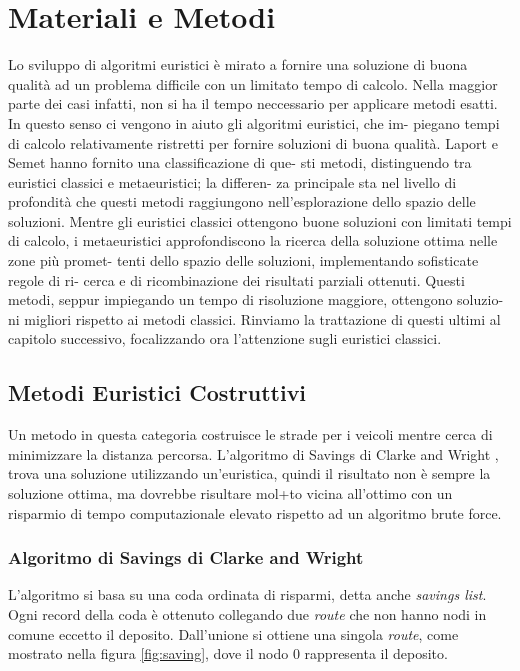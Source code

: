 \documentclass[]{article}
\begin{document}
\section{Materiali e Metodi}
Lo sviluppo di algoritmi euristici è mirato a fornire una soluzione di buona
qualità ad un problema difficile con un limitato tempo di calcolo. Nella
maggior parte dei casi infatti, non si ha il tempo neccessario per applicare
metodi esatti.
In questo senso ci vengono in aiuto gli algoritmi euristici, che im-
piegano tempi di calcolo relativamente ristretti per fornire soluzioni di
buona qualità. Laport e Semet hanno fornito una classificazione di que-
sti metodi, distinguendo tra euristici classici e metaeuristici; la differen-
za principale sta nel livello di profondità che questi metodi raggiungono
nell’esplorazione dello spazio delle soluzioni. Mentre gli euristici classici
ottengono buone soluzioni con limitati tempi di calcolo, i metaeuristici
approfondiscono la ricerca della soluzione ottima nelle zone più promet-
tenti dello spazio delle soluzioni, implementando sofisticate regole di ri-
cerca e di ricombinazione dei risultati parziali ottenuti. Questi metodi,
seppur impiegando un tempo di risoluzione maggiore, ottengono soluzio-
ni migliori rispetto ai metodi classici. Rinviamo la trattazione di questi
ultimi al capitolo successivo, focalizzando ora l’attenzione sugli euristici
classici.
\subsection{Metodi Euristici Costruttivi}
Un metodo in questa categoria costruisce le strade per i veicoli mentre cerca di minimizzare la distanza percorsa.
L'algoritmo di Savings di Clarke and Wright \cite{CK1}, trova una soluzione utilizzando un'euristica, quindi il risultato non è sempre la soluzione ottima, ma dovrebbe risultare mol+to vicina all'ottimo con un risparmio di tempo computazionale elevato rispetto ad un algoritmo brute force.


\subsubsection{Algoritmo di Savings di Clarke and Wright}
L'algoritmo si basa su una coda ordinata di risparmi, detta anche \emph{savings list}.
Ogni record della coda è ottenuto collegando due \emph{route} che non hanno nodi in comune eccetto il deposito.
Dall'unione si ottiene una singola \emph{route}, come mostrato nella figura \ref{fig:saving}, dove il nodo 0 rappresenta il deposito.
\end{document}
